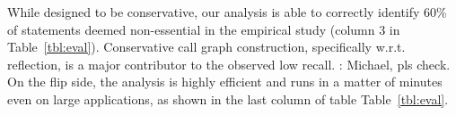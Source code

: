 
%

While designed to be conservative, our analysis is able to correctly identify %
60\% of statements deemed non-essential in the empirical study 
(column 3 in Table~\ref{tbl:eval}). 
Conservative call graph construction, specifically w.r.t. reflection, is a major contributor to the observed low recall. {\JR: Michael, pls check.}
On the flip side, the analysis is highly efficient and runs in a matter of minutes even on large applications, as shown in the last column of table Table~\ref{tbl:eval}.



